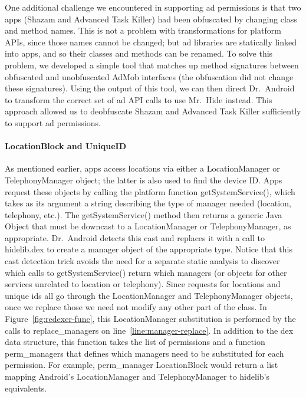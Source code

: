 \documentclass[preprint]{sig-alternate-10pt}
\newcommand{\code}[1]{\textsf{#1}}
\newcommand{\lib}{Mr.\ Hide\xspace}
\newcommand{\rewriter}{Dr.\ Android\xspace}
\begin{document}

One additional challenge we encountered in supporting ad permissions
is that two apps (Shazam and Advanced Task Killer)
had been obfuscated by
changing class and method names. This is not a problem with
transformations for platform APIs, since those names cannot be
changed; but ad libraries are statically linked into apps, and so
their classes and methods can be renamed. To solve this problem, we
developed a simple tool that matches up method signatures between
obfuscated and unobfuscated AdMob interfaces (the obfuscation did not
change these signatures). Using the output of this tool, we can then
direct \rewriter to transform the correct set of ad API calls to use
\lib instead. This approach allowed us to deobfuscate Shazam and Advanced Task
Killer sufficiently to support ad permissions.

\paragraph*{LocationBlock and UniqueID}

As mentioned earlier, apps access locations via either a
\code{LocationManager} or \code{TelephonyManager} object; the latter
is also used to find the device ID. Apps request
these objects by calling the platform function \code{getSystemService()},
which takes as its argument a string describing the type of
manager needed (location, telephony, etc.). The
\code{getSystemService()} method then returns
a generic Java \code{Object} that must be downcast to a
\code{LocationManager} or \code{TelephonyManager}, as appropriate.
\rewriter detects this cast and replaces it
with a call to \code{hidelib.dex} to create a manager object of the
appropriate type. Notice that this cast detection trick avoids the need for a
separate static analysis to discover which calls to
\code{getSystemService()} return which managers (or objects for other services
unrelated to location or telephony).
Since requests for locations and unique ids all go through the
\code{LocationManager} and \code{TelephonyManager} objects, once we replace those we need not
modify any other part of the class.
%
In Figure~\ref{fig:redexer-func}, this \code{LocationManager}
substitution is performed by the calls to \code{replace\_managers} on
line~\ref{line:manager-replace}. In addition to the \code{dex} data
structure, this function takes the list of permissions and a function
\code{perm\_managers} that defines which managers need to be
substituted for each permission. For example, \code{perm\_manager
  LocationBlock} would return a list mapping Android's \code{LocationManager}
and \code{TelephonyManager} to \code{hidelib}'s equivalents.
\end{document}
